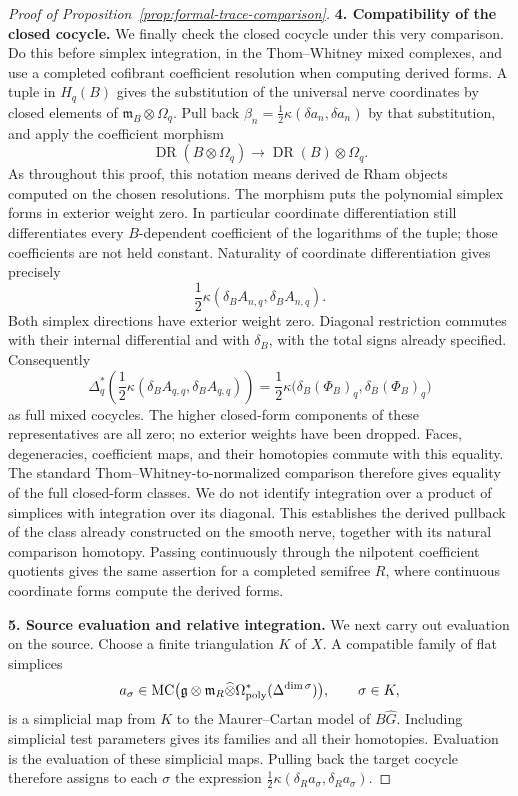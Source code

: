 \begin{proof}[Proof of Proposition~\ref{prop:formal-trace-comparison}]
\smallskip\noindent\textbf{4. Compatibility of the closed cocycle.}\quad
We finally check the closed cocycle under this very comparison.  Do this
before simplex integration, in the Thom--Whitney mixed complexes, and
use a completed cofibrant coefficient resolution when computing derived
forms.  A tuple in \(H_q(B)\) gives the substitution of the universal
nerve coordinates by closed elements of
\(\mathfrak m_B\otimes\Omega_q\).  Pull back
\(\beta_n=\tfrac12\kappa(\delta a_n,\delta a_n)\) by that
substitution, and apply the coefficient morphism
\[
 \operatorname{DR}(B\otimes\Omega_q)
             \longrightarrow\operatorname{DR}(B)\otimes\Omega_q.
\]
As throughout this proof, this notation means derived de Rham objects
computed on the chosen resolutions.  The morphism puts the polynomial
simplex forms in exterior weight zero.  In particular coordinate
differentiation still differentiates every \(B\)-dependent coefficient
of the logarithms of the tuple; those coefficients are not held
constant.  Naturality of coordinate differentiation gives precisely
\[
                \frac12\kappa(\delta_B A_{n,q},
                                      \delta_B A_{n,q}).
\]
Both simplex directions have exterior weight zero.  Diagonal restriction
commutes with their internal differential and with \(\delta_B\), with
the total signs already specified.  Consequently
\[
 \Delta_q^*\!\left(\frac12\kappa(\delta_B A_{q,q},
                                         \delta_B A_{q,q})\right)
       =\frac12\kappa\bigl(\delta_B(\Phi_B)_q,
                          \delta_B(\Phi_B)_q\bigr)
\]
as full mixed cocycles.  The higher closed-form components of these
representatives are all zero; no exterior weights have been dropped.
Faces, degeneracies, coefficient maps, and their homotopies commute with
this equality.  The standard Thom--Whitney-to-normalized comparison
therefore gives equality of the full closed-form classes.  We do not
identify integration over a product of simplices with integration over
its diagonal.  This establishes the derived pullback of the class
already constructed on the smooth nerve, together with its natural
comparison homotopy.  Passing continuously through the nilpotent
coefficient quotients gives the same assertion for a completed semifree
\(R\), where continuous coordinate forms compute the derived forms.

\smallskip\noindent\textbf{5. Source evaluation and relative integration.}\quad
We next carry out evaluation on the source.  Choose a finite
triangulation \(K\) of \(X\).  A compatible family of flat simplices
\[
 a_\sigma\in
 \operatorname{MC}\bigl(\mathfrak g\otimes\mathfrak m_R
                    \widehat\otimes\Omega_{\mathrm{poly}}^*(\Delta^{\dim\sigma})
       \bigr),\qquad \sigma\in K,
\]
is a simplicial map from \(K\) to the Maurer--Cartan model of
\(B\widehat G\).  Including simplicial test parameters gives its
families and all their homotopies.  Evaluation is the evaluation
of these simplicial maps.  Pulling back the target cocycle therefore
assigns to each \(\sigma\) the expression
\(\tfrac12\kappa(\delta_Ra_\sigma,\delta_Ra_\sigma)\).


\end{proof}
